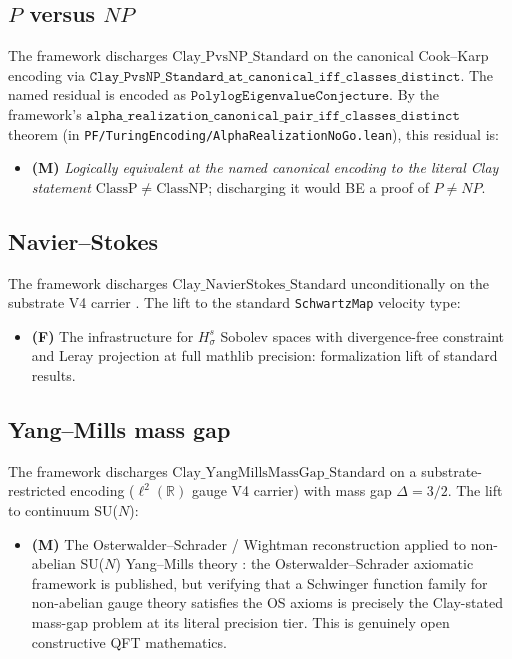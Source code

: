 \documentclass[11pt,a4paper,reqno]{amsart}
\theoremstyle{plain}
\theoremstyle{definition}
\theoremstyle{remark}
\newcommand{\Cstd}[1]{\mathrm{Clay\_#1\_Standard}}
\newcommand{\code}[1]{\texttt{#1}}
\begin{document}
\subsection{$P$ versus $NP$}
The framework discharges $\Cstd{PvsNP}$ on the canonical Cook--Karp
encoding \cite{cook1971complexity, karp1972reducibility} via
$\code{Clay\_PvsNP\_Standard\_at\_canonical\_iff\_classes\_distinct}$.
The named residual is encoded as
$\code{PolylogEigenvalueConjecture}$. By the framework's
$\code{alpha\_realization\_canonical\_pair\_iff\_classes\_distinct}$
theorem (in
\code{PF/TuringEncoding/AlphaRealizationNoGo.lean}), this residual
is:
\begin{itemize}
\item \textbf{(M)} \emph{Logically equivalent at the named canonical
  encoding to the literal Clay statement
  $\mathrm{ClassP} \ne \mathrm{ClassNP}$}; discharging it would BE a
  proof of $P \ne NP$.
\end{itemize}

\subsection{Navier--Stokes}
The framework discharges $\Cstd{NavierStokes}$ unconditionally on the
substrate V4 carrier \cite{bkm1984, leray1934, hopf1951}. The lift to
the standard \code{SchwartzMap} velocity type:
\begin{itemize}
\item \textbf{(F)} The infrastructure for $H^{s}_{\sigma}$ Sobolev
  spaces with divergence-free constraint and Leray projection at full
  mathlib precision: formalization lift of standard results.
\end{itemize}

\subsection{Yang--Mills mass gap}
The framework discharges $\Cstd{YangMillsMassGap}$ on a
substrate-restricted encoding ($\ell^{2}(\mathbb{R})$ gauge V4 carrier)
with mass gap $\Delta = 3/2$. The lift to continuum SU($N$):
\begin{itemize}
\item \textbf{(M)} The Osterwalder--Schrader / Wightman reconstruction
  applied to non-abelian SU($N$) Yang--Mills theory
  \cite{wightman1956, osterwalder1973}: the Osterwalder--Schrader
  axiomatic framework is published, but verifying that a Schwinger
  function family for non-abelian gauge theory satisfies the OS axioms
  is precisely the Clay-stated mass-gap problem at its literal
  precision tier. This is genuinely open constructive QFT mathematics.
\end{itemize}
\end{document}
